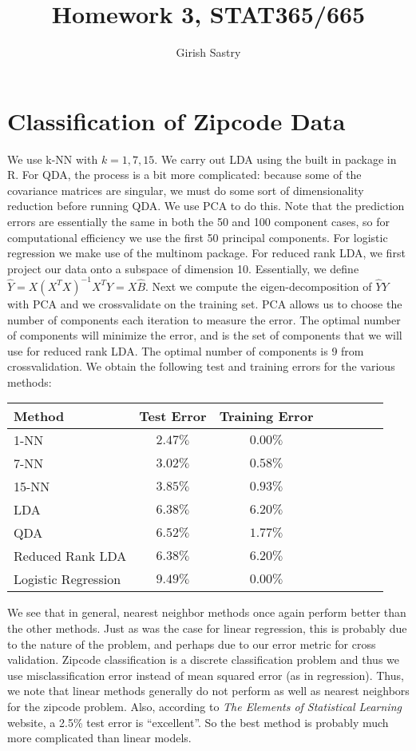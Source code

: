 \documentclass[a4paper,10pt]{article}
\title{Homework 3, STAT365/665}
\author{Girish Sastry}
\begin{document}
\maketitle

\section{Classification of Zipcode Data}

We use k-NN with $k=1,7,15$. We carry out LDA using the built in package in R.
For QDA, the process is a bit more complicated: because some of the covariance
matrices are singular, we must do some sort of dimensionality reduction before
running QDA. We use PCA to do this. Note that the prediction errors are 
essentially the same in both the 50 and 100 component cases, so for computational
efficiency we use the first 50 principal components. For logistic regression 
we make use of the multinom package. For reduced rank LDA, we first project
our data onto a subspace of dimension 10. Essentially, we define
$\hat{Y} = X(X^TX)^{-1}X^TY = X\hat{B}$. Next we compute the eigen-decomposition
of $\hat{Y}Y$ with PCA and we crossvalidate on the training set. PCA allows us
to choose the number of components each iteration to measure the error. The 
optimal number of components will minimize the error, and is the set of
components that we will use for reduced rank LDA. The optimal number of
components is 9 from crossvalidation. We obtain the following test and training
errors for the various methods:

\begin{tabular}{l*{6}{c}r}
 Method		& Test Error & Training Error \\
 \hline
 1-NN	& $2.47\%$ & $0.00\%$ \\
 7-NN 	& $3.02\%$ & $0.58\%$ \\
 15-NN	& $3.85\%$ & $0.93\%$ \\
 LDA	& $6.38\%$ & $6.20\%$ \\
 QDA	& $6.52\%$ & $1.77\%$ \\
 Reduced Rank LDA	& $6.38\%$ & $6.20\%$ \\
 Logistic Regression	& $9.49\%$ & $0.00\%$ \\
\end{tabular}

We see that in general, nearest neighbor methods once again perform better
than the other methods. Just as was the case for linear regression, this is 
probably due to the nature of the problem, and perhaps due to our error metric
for cross validation. Zipcode classification is a discrete classification 
problem and thus we use misclassification error instead of mean squared error
(as in regression). Thus, we note that linear methods generally do not perform
as well as nearest neighbors for the zipcode problem. Also, according to 
\textit{The Elements of Statistical Learning} website, a 2.5\% test error 
is ``excellent''. So the best method is probably much more complicated
than linear models.
\end{document}

